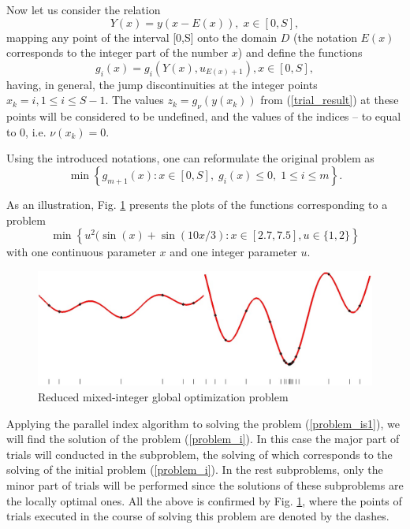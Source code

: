 \documentclass{llncs}
\begin{document}
Now let us consider the relation 
\[
Y(x)=y(x-E(x)), \; x\in[0,S],
\]
mapping any point of the interval [0,S] onto the domain $D$ (the notation $E(x)$ corresponds 
to the integer part of the number $x$) and define the functions 
\[
g_i(x) = g_i(Y(x),u_{E(x)+1}), x\in[0,S],
\]
having, in general, the jump discontinuities at the integer points $x_k = i, 1\leq i \leq 
S-1$.
The values $z_k = g_\nu(y(x_k))$ from (\ref{trial_result}) at these points will be considered to 
be undefined, and the values of the indices -- to equal to 0, i.e. $\nu(x_k) = 0$.

Using the introduced notations, one can reformulate the original problem as
\begin{equation}\label{problem_is1}
\min \left\{g_{m+1}(x): x \in [0,S], \; g_i(x) \leq 0, \; 1 \leq i \leq m\right\}.
\end{equation}

As an illustration, Fig. \ref{fig:1} presents the plots of the functions corresponding to a 
problem 
\[
\min{\left\{ u^2 (\sin(x) +\sin(10x/3) : x\in [2.7, 7.5], u \in \{1,2\} \right\}}
\]
with one continuous parameter $x$ and one integer parameter $u$.

\begin{figure}[ht]
    \centering
    \includegraphics[width=1.0\textwidth] {fig1.jpg}
    \caption{Reduced mixed-integer global optimization problem}
    \label{fig:1}
\end{figure}

Applying the parallel index algorithm to solving the problem (\ref{problem_is1}), we will find 
the solution of the problem (\ref{problem_i}). In this case the major part of trials will conducted 
in 
the subproblem, the solving of which corresponds to the solving of the initial 
problem (\ref{problem_i}). In the rest subproblems, only the minor part of trials will be 
performed 
since the solutions of these subproblems are the locally optimal ones.
All the above is confirmed by Fig. \ref{fig:1}, where the  
points of trials executed in the course of solving this problem are denoted by the dashes.
\end{document}
